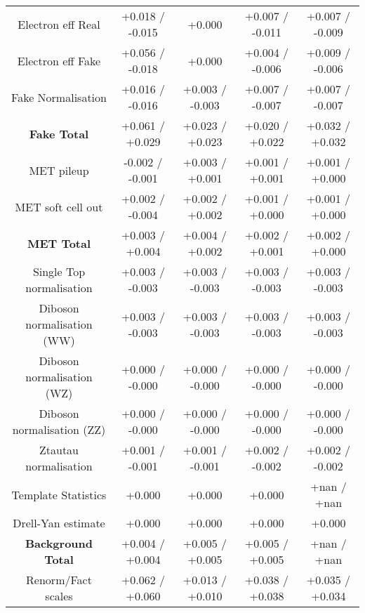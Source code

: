 \begin{table}[htbp]
\begin{center}
\begin{tabular}{|c|c|c|c|c|}
Electron eff Real                     &+0.018   / -0.015   & +0.000              & +0.007   / -0.011   & +0.007   / -0.009  \\
Electron eff Fake                     &+0.056   / -0.018   & +0.000              & +0.004   / -0.006   & +0.009   / -0.006  \\
Fake Normalisation                    &+0.016   / -0.016   & +0.003   / -0.003   & +0.007   / -0.007   & +0.007   / -0.007  \\
\hline
\textbf{Fake Total}                   &+0.061   / +0.029   & +0.023   / +0.023   & +0.020   / +0.022   & +0.032   / +0.032  \\
\hline
MET pileup                            &-0.002   / -0.001   & +0.003   / +0.001   & +0.001   / +0.001   & +0.001   / +0.000  \\
MET soft cell out                     &+0.002   / -0.004   & +0.002   / +0.002   & +0.001   / +0.000   & +0.001   / +0.000  \\
\hline
\textbf{MET Total}                    &+0.003   / +0.004   & +0.004   / +0.002   & +0.002   / +0.001   & +0.002   / +0.000  \\
\hline
Single Top normalisation              &+0.003   / -0.003   & +0.003   / -0.003   & +0.003   / -0.003   & +0.003   / -0.003  \\
Diboson normalisation (WW)            &+0.003   / -0.003   & +0.003   / -0.003   & +0.003   / -0.003   & +0.003   / -0.003  \\
Diboson normalisation (WZ)            &+0.000   / -0.000   & +0.000   / -0.000   & +0.000   / -0.000   & +0.000   / -0.000  \\
Diboson normalisation (ZZ)            &+0.000   / -0.000   & +0.000   / -0.000   & +0.000   / -0.000   & +0.000   / -0.000  \\
Ztautau normalisation                 &+0.001   / -0.001   & +0.001   / -0.001   & +0.002   / -0.002   & +0.002   / -0.002  \\
Template Statistics                   &+0.000              & +0.000              & +0.000              & +nan     / +nan    \\
Drell-Yan estimate                    &+0.000              & +0.000              & +0.000              & +0.000             \\
\hline
\textbf{Background Total}             &+0.004   / +0.004   & +0.005   / +0.005   & +0.005   / +0.005   & +nan     / +nan    \\
\hline
Renorm/Fact scales                    &+0.062   / +0.060   & +0.013   / +0.010   & +0.038   / +0.038   & +0.035   / +0.034  \\

\end{tabular}
\end{center}
\end{table}
